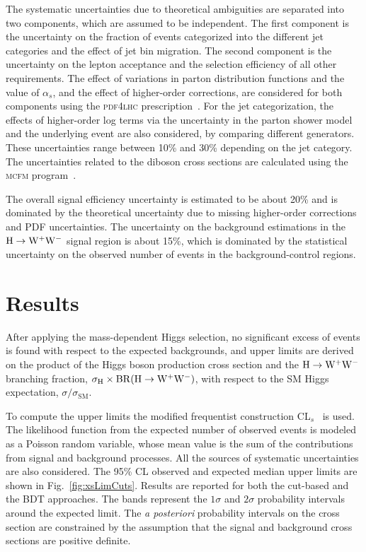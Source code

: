 \documentclass[12pt,twoside,a4paper,cmspaper,final,collab]{cms-tdr}
\begin{document}
The systematic uncertainties due to theoretical ambiguities are separated
into two components, which are assumed to be
independent. The first component is the uncertainty on the fraction of
events categorized into the different jet categories and the effect of jet bin migration.
The second component is the uncertainty on
the lepton acceptance and the selection efficiency of all other
requirements. The effect of variations in parton distribution functions and the
value of $\alpha_{s}$, and the effect of higher-order corrections,
are considered for both components using the \textsc{pdf4lhc}
prescription~\cite{Botje:2011sn,Alekhin:2011sk,Lai:2010vv,Martin:2009iq,Ball:2011mu}.
For the jet categorization, the effects of higher-order log terms via
the uncertainty in the parton shower model and the underlying event
are also considered, by comparing different generators. These uncertainties range
between 10\% and 30\% depending on the jet category.
The uncertainties related to the diboson
cross sections are calculated using the \textsc{mcfm} program~\cite{MCFM}.

The overall signal efficiency uncertainty is estimated to be about 20\%
and is dominated by the theoretical uncertainty due to missing
higher-order corrections and PDF uncertainties. The uncertainty on the background estimations
in the $\mathrm{H}\to\mathrm{W^+}{}\mathrm{W^-}$ signal region is about 15\%, which is dominated by the
statistical uncertainty on the observed number of events in the background-control regions.

\section{Results}
\label{sec:results}
After applying the mass-dependent Higgs selection, no significant
excess of events is found with respect to the expected backgrounds,
and upper limits are derived on the product of the Higgs boson
production cross section and the $\mathrm{H} \to \mathrm{W^+}{}\mathrm{W^-}$ branching fraction,
$\sigma_{\mathrm{H}} \times \mathrm{BR}(\mathrm{H} \to \mathrm{W^+}{}\mathrm{W^-})$, with respect to the
SM Higgs expectation, $\sigma/\sigma_\text{SM}$.

To compute the upper limits the modified frequentist construction
CL$_{s}$~\cite{Read1,junkcls,LHC-HCG} is used. The likelihood function from the
expected number of observed events is modeled as a Poisson random variable,
whose mean value is the sum of the contributions from signal and background
processes. All the sources of systematic uncertainties are also considered.
The 95\% CL observed and expected median upper limits are shown in
Fig.~\ref{fig:xsLimCuts}. Results are reported for both the
cut-based and the BDT approaches. The bands represent the $1 \sigma$ and
$2 \sigma$ probability intervals around the expected limit. The
\textit{a posteriori} probability intervals on the cross section are
constrained by the assumption that the signal and
background cross sections are positive definite.
\end{document}
